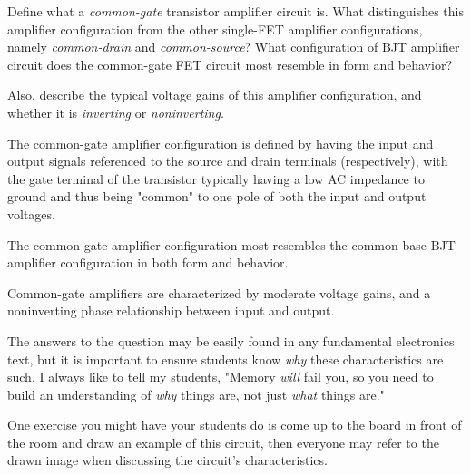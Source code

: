 

Define what a {\it common-gate} transistor amplifier circuit is.  What distinguishes this amplifier configuration from the other single-FET amplifier configurations, namely {\it common-drain} and {\it common-source}?  What configuration of BJT amplifier circuit does the common-gate FET circuit most resemble in form and behavior?

Also, describe the typical voltage gains of this amplifier configuration, and whether it is {\it inverting} or {\it noninverting}.







The common-gate amplifier configuration is defined by having the input and output signals referenced to the source and drain terminals (respectively), with the gate terminal of the transistor typically having a low AC impedance to ground and thus being "common" to one pole of both the input and output voltages.  

The common-gate amplifier configuration most resembles the common-base BJT amplifier configuration in both form and behavior. 

Common-gate amplifiers are characterized by moderate voltage gains, and a noninverting phase relationship between input and output.







The answers to the question may be easily found in any fundamental electronics text, but it is important to ensure students know {\it why} these characteristics are such.  I always like to tell my students, "Memory {\it will} fail you, so you need to build an understanding of {\it why} things are, not just {\it what} things are."

One exercise you might have your students do is come up to the board in front of the room and draw an example of this circuit, then everyone may refer to the drawn image when discussing the circuit's characteristics.




